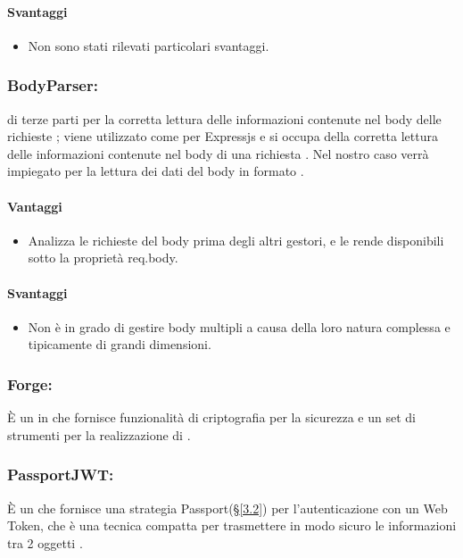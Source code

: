 	\paragraph{Svantaggi}
	\begin{itemize}
	\item Non sono stati rilevati particolari svantaggi.
	\end{itemize}

	\subsubsection{BodyParser:}  di terze parti per la corretta lettura delle informazioni contenute nel body delle richieste ; viene utilizzato come  per {Expressjs} e si occupa della corretta lettura delle informazioni contenute nel body di una richiesta . Nel nostro caso verrà impiegato per la lettura dei dati del body in formato .
	\paragraph{Vantaggi}
	\begin{itemize}
	\item Analizza le richieste del body prima degli altri gestori, e le rende disponibili sotto la proprietà req.body.
	\end{itemize}
	\paragraph{Svantaggi}
		\begin{itemize}
	\item Non è in grado di gestire body multipli a causa della loro natura complessa e tipicamente di grandi dimensioni.
	\end{itemize}

	\subsubsection{Forge:} È un  in  che fornisce funzionalità di criptografia per la sicurezza e un set di strumenti per la realizzazione di .

	\subsubsection{PassportJWT:} È un  che fornisce una strategia Passport(\S\ref{3.2}) per l'autenticazione con un  Web Token, che è una tecnica compatta per trasmettere in modo sicuro le informazioni tra 2 oggetti .
